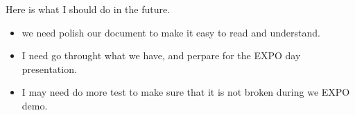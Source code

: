 Here is what I should do in the future.
\begin{itemize}
  \item we need polish our document to make it easy to read and understand.
  \item I need go throught what we have, and perpare for the EXPO day presentation.
  \item I may need do more test to make sure that it is not broken during we EXPO demo.
\end{itemize}

